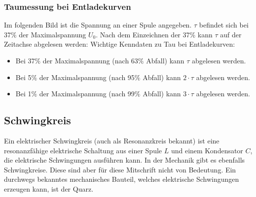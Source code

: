 \subsubsection{Taumessung bei Entladekurven}
Im folgenden Bild ist die Spannung an einer Spule angegeben. $\tau$ befindet sich bei 37$\%$ der Maximalspannung $U_0$. Nach dem Einzeichnen der 37\% kann $\tau$ auf der Zeitachse abgelesen werden:
Wichtige Kenndaten zu Tau bei Entladekurven:
\begin{itemize}
    \item Bei 37$\%$ der Maximalspannung (nach 63$\%$ Abfall) kann $\tau$ abgelesen werden.
    \item Bei 5$\%$ der Maximalspannung (nach 95$\%$ Abfall) kann $2\cdot\tau$ abgelesen werden.
    \item Bei 1$\%$ der Maximalspannung (nach 99$\%$ Abfall) kann $3\cdot\tau$ abgelesen werden.
\end{itemize}
\subsection{Schwingkreis}
Ein elektrischer Schwingkreis (auch als Resonanzkreis bekannt) ist eine resonanzfähige elektrische Schaltung aus einer Spule $L$ und einem Kondensator $C$, die elektrische Schwingungen ausführen kann. In der Mechanik gibt es ebenfalls Schwingkreise. Diese sind aber für diese Mitschrift nicht von Bedeutung. Ein durchwegs bekanntes mechanisches Bauteil, welches elektrische Schwingungen erzeugen kann, ist der Quarz.

